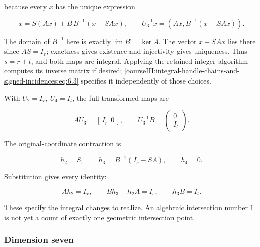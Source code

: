 because every \(x\) has the unique expression

\begin{equation}
x=S(Ax)+B\,B^{-1}(x-SAx),\qquad
 U_3^{-1}x=(Ax,B^{-1}(x-SAx)).
 \label{courseIII:integral-handle-chains-and-signed-incidences:eq:6.3}
\end{equation}

The domain of \(B^{-1}\) here is exactly \(\operatorname{im}B=\ker A\). The vector \(x-SAx\) lies there since \(AS=I_r\); exactness gives existence and injectivity gives uniqueness. Thus \(s=r+t\), and both maps are integral. Applying the retained integer algorithm computes its inverse matrix if desired; \eqref{courseIII:integral-handle-chains-and-signed-incidences:eq:6.3} specifies it independently of those choices.

With \(U_2=I_r,\ U_4=I_t\), the full transformed maps are

\begin{equation}
AU_3=[\,I_r\ \ 0\,],\qquad
 U_3^{-1}B=\begin{pmatrix}0\\I_t\end{pmatrix}.
 \label{courseIII:integral-handle-chains-and-signed-incidences:eq:6.4}
\end{equation}

The original-coordinate contraction is

\begin{equation}
h_2=S,\qquad h_3=B^{-1}(I_s-SA),\qquad h_4=0.
 \label{courseIII:integral-handle-chains-and-signed-incidences:eq:6.5}
\end{equation}

Substitution gives every identity:

\begin{equation}
Ah_2=I_r,\qquad Bh_3+h_2A=I_s,\qquad h_3B=I_t.
 \label{courseIII:integral-handle-chains-and-signed-incidences:eq:6.6}
\end{equation}

These specify the integral changes to realize. An algebraic intersection number \(1\) is not yet a count of exactly one geometric intersection point.

\subsubsection{Dimension seven}
\label{courseIII:integral-handle-chains-and-signed-incidences:section-6.2}

\label{courseIII:handle-chains:6.2}

